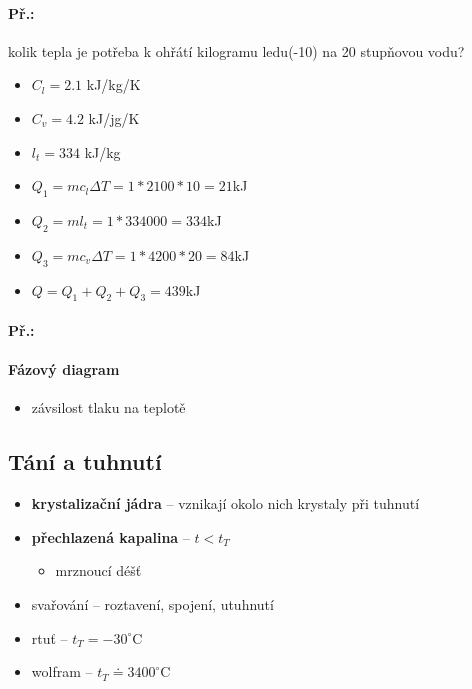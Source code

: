 \paragraph{Př.:} kolik tepla je potřeba k ohřátí kilogramu ledu(-10) na 20 stupňovou vodu?
\begin{itemize}
\item $C_l = 2.1$ kJ/kg/K
\item $C_v = 4.2$ kJ/jg/K
\item $l_t = 334$ kJ/kg
\item $Q_1 = mc_l\Delta T = 1*2100*10 = 21$kJ
\item $Q_2 = ml_t = 1*334000 = 334$kJ
\item $Q_3 = mc_v\Delta T = 1*4200*20 = 84$kJ
\item $Q = Q_1 + Q_2 + Q_3 = 439$kJ
\end{itemize}

\paragraph{Př.:}

\paragraph{Fázový diagram}
\begin{itemize}
\item závsilost tlaku na teplotě
\end{itemize}

\subsection{Tání a tuhnutí}
\begin{itemize}
\item \textbf{krystalizační jádra} -- vznikají okolo nich krystaly při tuhnutí
\item \textbf{přechlazená kapalina} -- $t < t_T$
	\begin{itemize}
	\item mrznoucí déšť
	\end{itemize}
\item svařování -- roztavení, spojení, utuhnutí
\item rtuť -- $t_T = -30^\circ$C
\item wolfram -- $t_T \doteq 3400^\circ$C
\end{itemize}

